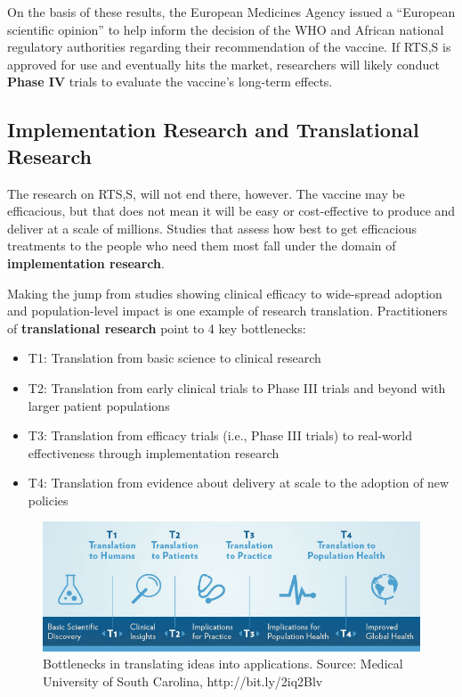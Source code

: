 \documentclass[justified,twoside,symmetric,]{tufte-book}
\providecommand{\tightlist}{%
  \setlength{\itemsep}{0pt}\setlength{\parskip}{0pt}}
\let\subsubsection\subsection
\begin{document}
On the basis of these results, the European Medicines Agency issued a ``European scientific opinion'' to help inform the decision of the WHO and African national regulatory authorities regarding their recommendation of the vaccine. If RTS,S is approved for use and eventually hits the market, researchers will likely conduct \textbf{Phase IV} trials to evaluate the vaccine's long-term effects.

\hypertarget{implementation-research-and-translational-research}{%
\subsubsection*{Implementation Research and Translational Research}\label{implementation-research-and-translational-research}}

The research on RTS,S, will not end there, however. The vaccine may be efficacious, but that does not mean it will be easy or cost-effective to produce and deliver at a scale of millions. Studies that assess how best to get efficacious treatments to the people who need them most fall under the domain of \textbf{implementation research}.

Making the jump from studies showing clinical efficacy to wide-spread adoption and population-level impact is one example of research translation. Practitioners of \textbf{translational research} point to 4 key bottlenecks:

\begin{itemize}
\tightlist
\item
  T1: Translation from basic science to clinical research
\item
  T2: Translation from early clinical trials to Phase III trials and beyond with larger patient populations
\item
  T3: Translation from efficacy trials (i.e., Phase III trials) to real-world effectiveness through implementation research
\item
  T4: Translation from evidence about delivery at scale to the adoption of new policies
\end{itemize}

\begin{figure}
\includegraphics{images/translational} \caption[Bottlenecks in translating ideas into applications]{Bottlenecks in translating ideas into applications. Source: Medical University of South Carolina, http://bit.ly/2iq2Blv}\label{fig:translational}
\end{figure}
\end{document}
